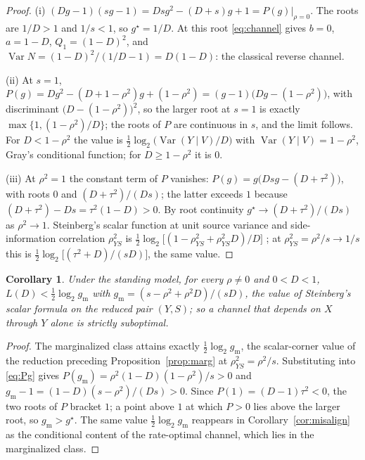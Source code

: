 \documentclass[11pt,onecolumn]{IEEEtran}
\newtheorem{corollary}[theorem]{Corollary}
\begin{document}
\begin{proof}
(i) $(Dg-1)(sg-1)=Dsg^2-(D+s)g+1=P(g)\big|_{\rho=0}$. The roots are
$1/D>1$ and $1/s<1$, so $g^\star=1/D$. At this root \eqref{eq:channel}
gives $b=0$, $a=1-D$, $Q_1=(1-D)^2$, and
$\operatorname{Var}N=(1-D)^2/(1/D-1)=D(1-D)$: the classical reverse
channel.

(ii) At $s=1$,
$P(g)=Dg^2-(D+1-\rho^2)g+(1-\rho^2)=(g-1)\bigl(Dg-(1-\rho^2)\bigr)$,
with discriminant $\bigl(D-(1-\rho^2)\bigr)^2$, so the larger root at
$s=1$ is exactly $\max\{1,(1-\rho^2)/D\}$; the roots of $P$ are
continuous in $s$, and the limit follows. For $D<1-\rho^2$ the value
is $\tfrac12\log_2\bigl(\operatorname{Var}(Y\mid V)/D\bigr)$ with
$\operatorname{Var}(Y\mid V)=1-\rho^2$, Gray's conditional function;
for $D\ge1-\rho^2$ it is $0$.

(iii) At $\rho^2=1$ the constant term of $P$ vanishes:
$P(g)=g\bigl(Dsg-(D+\tau^2)\bigr)$, with roots $0$ and
$(D+\tau^2)/(Ds)$; the latter exceeds $1$ because
$(D+\tau^2)-Ds=\tau^2(1-D)>0$. By root continuity
$g^\star\to(D+\tau^2)/(Ds)$ as $\rho^2\to1$. Steinberg's scalar
function at unit source variance and side-information correlation
$\rho_{YS}^2$ is
$\tfrac12\log_2\bigl[(1-\rho_{YS}^2+\rho_{YS}^2D)/D\bigr]$
\cite{steinberg2009}; at $\rho_{YS}^2=\rho^2/s\to1/s$
this is $\tfrac12\log_2\bigl[(\tau^2+D)/(sD)\bigr]$, the same value.
\end{proof}

\begin{corollary}\label{cor:margstrict}
Under the standing model, for every $\rho\ne0$ and $0<D<1$,
$L(D)<\tfrac12\log_2 g_{\mathrm m}$ with $g_{\mathrm m}=(s-\rho^2+\rho^2D)/(sD)$, the value
of Steinberg's scalar formula \cite{steinberg2009} on the reduced pair
$(Y,S)$; so a channel that depends on $X$ through $Y$ alone is strictly
suboptimal.
\end{corollary}

\begin{proof}
The marginalized class attains exactly $\tfrac12\log_2g_{\mathrm m}$, the
scalar-corner value of the reduction preceding
Proposition~\ref{prop:marg} at $\rho_{YS}^2=\rho^2/s$. Substituting into
\eqref{eq:Pg} gives $P(g_{\mathrm m})=\rho^2(1-D)(1-\rho^2)/s>0$ and
$g_{\mathrm m}-1=(1-D)(s-\rho^2)/(Ds)>0$. Since $P(1)=(D-1)\tau^2<0$, the two
roots of $P$ bracket $1$; a point above $1$ at which $P>0$ lies above
the larger root, so $g_{\mathrm m}>g^\star$. The same value
$\tfrac12\log_2 g_{\mathrm m}$ reappears in Corollary~\ref{cor:misalign} as
the conditional content of the rate-optimal channel, which lies in the
marginalized class.
\end{proof}
\end{document}
